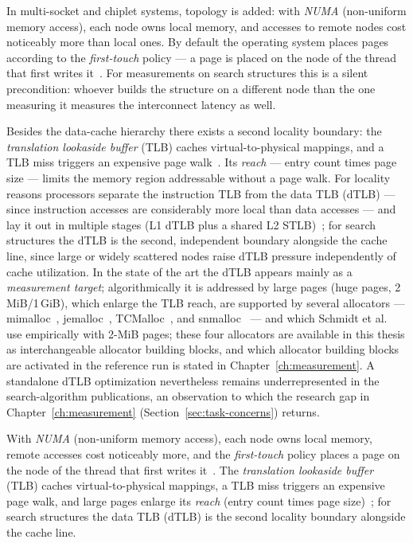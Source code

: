 \begin{nurlang}
In multi-socket and chiplet systems, topology is added: with \emph{NUMA} (non-uniform memory
access), each node owns local memory, and accesses to remote nodes cost noticeably more than local
ones. By default the operating system places pages according to the \emph{first-touch} policy ---
a page is placed on the node of the thread that first writes it~\cite{lameter2013numa}. For
measurements on search structures this is a silent precondition: whoever builds the structure on a
different node than the one measuring it measures the interconnect latency as well.

Besides the data-cache hierarchy there exists a second locality boundary: the \emph{translation lookaside
buffer} (TLB) caches virtual-to-physical mappings, and a TLB miss triggers an expensive page
walk~\cite{hennessy2019architecture}. Its \emph{reach} --- entry count times page size --- limits
the memory region addressable without a page walk. For locality reasons processors separate the instruction TLB from
the data TLB (dTLB) --- since instruction accesses are considerably more local than data accesses ---
and lay it out in multiple stages (L1 dTLB plus a shared L2 STLB)~\cite{intel_sdm,drepper2007memory}; for search
structures the dTLB is the second, independent boundary alongside the cache line, since large or widely
scattered nodes raise dTLB pressure independently of cache utilization. In the state of the art the dTLB appears mainly as a
\emph{measurement target}; algorithmically it is addressed by large pages (huge pages, 2\,MiB/1\,GiB),
which enlarge the TLB reach, are supported by several allocators --- mimalloc~\cite{leijen2019mimalloc},
jemalloc~\cite{evans2006jemalloc}, TCMalloc~\cite{hunter2021temeraire}, and
snmalloc~\cite{lietar2019snmalloc} --- and which Schmidt et al.~\cite{schmidt2025hbm} use empirically
with 2-MiB pages; these four allocators are available in this thesis as interchangeable allocator
building blocks, and which allocator building blocks are activated in the reference run is stated in
Chapter~\ref{ch:measurement}. A standalone dTLB optimization nevertheless remains underrepresented in
the search-algorithm publications, an observation to which the research gap in
Chapter~\ref{ch:measurement} (Section~\ref{sec:task-concerns}) returns.
\end{nurlang}
\begin{nurkurz}
With \emph{NUMA} (non-uniform memory access), each node owns local memory, remote accesses cost noticeably
more, and the \emph{first-touch} policy places a page on the node of the thread that first writes
it~\cite{lameter2013numa}. The \emph{translation lookaside buffer} (TLB) caches virtual-to-physical mappings,
a TLB miss triggers an expensive page walk, and large pages enlarge its \emph{reach} (entry count times page
size)~\cite{hennessy2019architecture}; for search structures the data TLB (dTLB) is the second locality
boundary alongside the cache line.
\end{nurkurz}

